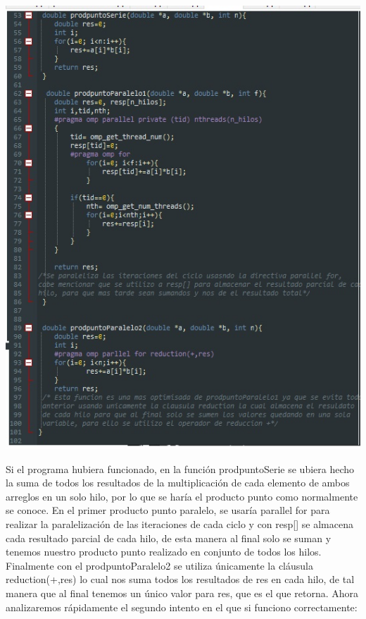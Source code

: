 \documentclass[12pt,letterpaper]{article}
\begin{document}
\includegraphics[scale=.8]{14.jpg}

 Si el programa hubiera funcionado, en la función prodpuntoSerie se ubiera hecho la suma de todos los resultados de la multiplicación de cada elemento de ambos arreglos en un solo hilo, por lo que se haría el producto punto como normalmente se conoce.
En  el primer producto punto paralelo, se usaría parallel for para realizar la paralelización de las iteraciones de cada ciclo y con resp[] se almacena cada resultado parcial de cada hilo, de esta manera al final solo se suman y tenemos nuestro producto punto realizado en conjunto de todos los hilos.
Finalmente con el prodpuntoParalelo2  se utiliza únicamente la cláusula reduction(+,res) lo cual nos suma todos los resultados de res en cada hilo, de tal manera que al final tenemos un único valor para res, que es el que retorna. 
Ahora analizaremos rápidamente el segundo intento en el que si funciono correctamente:
\end{document}
